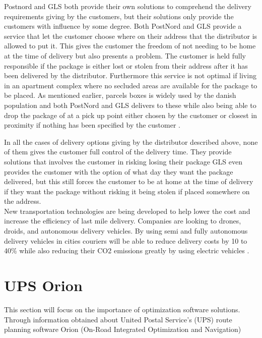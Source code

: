 \documentclass[12pt]{report}
\begin{document}
Postnord and GLS both provide their own solutions to comprehend the delivery requirements giving by the customers, but their solutions only provide the customers with influence by some degree. Both PostNord and GLS provide a service that let the customer choose where on their address that the distributor is allowed to put it. This gives the customer the freedom of not needing to be home at the time of delivery but also presents a problem. The customer is held fully responsible if the package is either lost or stolen from their address after it has been delivered by the distributor\cite{postnordoptions}\cite{glsoptions}. Furthermore this service is not optimal if living in an apartment complex where no secluded areas are available for the package to be placed. As mentioned earlier, parcels boxes is widely used by the danish population and both PostNord and GLS delivers to these while also being able to drop the package of at a pick up point either chosen by the customer or closest in proximity if nothing has been specified by the customer \cite{postnordoptions}\cite{glsoptions}.

In all the cases of delivery options giving by the distributor described above, none of them gives the customer full control of the delivery time. They provide solutions that involves the customer in risking losing their package\cite{Pakketyveri} GLS even provides the customer with the option of what day they want the package delivered, but this still forces the customer to be at home at the time of delivery if they want the package without risking it being stolen if placed somewhere on the address\cite{Pakketyveri}. \\


New transportation technologies are being developed to help lower the cost and increase the efficiency of last mile delivery. Companies are looking to drones, droids, and autonomous delivery vehicles. By using semi and fully autonomous delivery vehicles in cities couriers will be able to reduce delivery costs by 10 to 40\% while also reducing their CO2 emissions greatly by using electric vehicles \cite{FastForwardingLast-mileDelivery}. \\




\section{UPS Orion}
This section will focus on the importance of optimization software solutions. Through information obtained about United Postal Service's (UPS) route planning software Orion (On-Road Integrated Optimization and Navigation)\\
\end{document}
